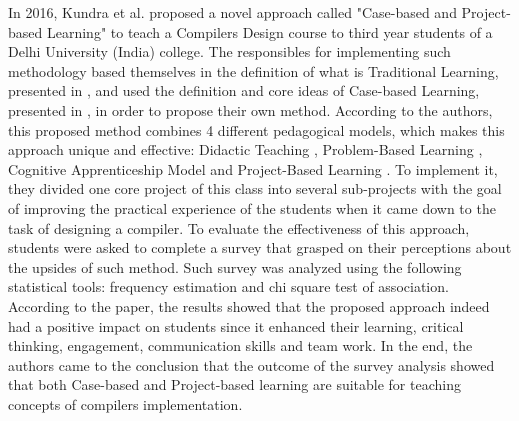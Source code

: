 In 2016, Kundra et al. \cite{kundra2016experience} proposed a novel approach called "Case-based and Project-based Learning" to teach a Compilers Design course to third year students of a Delhi University (India) college. The responsibles for implementing such methodology based themselves in the definition of what is Traditional Learning, presented in \cite{altman2010workplace}, and used the definition and core ideas of Case-based Learning, presented in \cite{golich2000abcs}, in order to propose their own method. According to the authors, this proposed method combines 4 different pedagogical models, which makes this approach unique and effective: Didactic Teaching \cite{altman2010workplace}, Problem-Based Learning \cite{hmelo2004problem}, Cognitive Apprenticeship Model \cite{dennen2008cognitive} and Project-Based Learning \cite{thomas2000review}. To implement it, they divided one core project of this class into several sub-projects with the goal of improving the practical experience of the students when it came down to the task of designing a compiler. To evaluate the effectiveness of this approach, students were asked to complete a survey that grasped on their perceptions about the upsides of such method. Such survey was analyzed using the following statistical tools: frequency estimation and chi square test of association. According to the paper, the results showed that the proposed approach indeed had a positive impact on students since it enhanced their learning, critical thinking, engagement, communication skills and team work. In the end, the authors came to the conclusion that the outcome of the survey analysis showed that both Case-based and Project-based learning are suitable for teaching concepts of compilers implementation.

